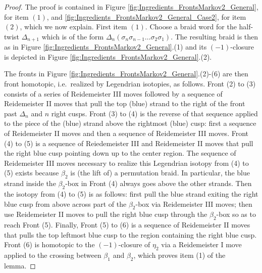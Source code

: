 \documentclass[10pt]{amsart}
\theoremstyle{plain}
\theoremstyle{definition}
\theoremstyle{remark}
\numberwithin{equation}{section}
\begin{document}
\begin{proof}
The proof is contained in Figure \ref{fig:Ingredients_FrontsMarkov2_General}, for item $(1)$, and \ref{fig:Ingredients_FrontsMarkov2_General_Case2}, for item $(2)$, which we now explain. First item $(1)$. Choose a braid word for the half-twist $\Delta_{n+1}$ which is of the form $\Delta_n(\sigma_n\sigma_{n-1}\ldots \sigma_2\sigma_1)$. The resulting braid is then as in Figure \ref{fig:Ingredients_FrontsMarkov2_General}.(1) and its $(-1)$-closure is depicted in Figure \ref{fig:Ingredients_FrontsMarkov2_General}.(2). 

The fronts in Figure \ref{fig:Ingredients_FrontsMarkov2_General}.(2)-(6) are then front homotopic, i.e.~realized by Legendrian isotopies, as follows. Front (2) to (3) consists of a series of Reidemeister III moves followed by a sequence of Reidemeister II moves that pull the top (blue) strand to the right of the front past $\Delta_n$ and $n$ right cusps. Front (3) to (4) is the reverse of that sequence applied to the piece of the (blue) strand above the rightmost (blue) cusp: first a sequence of Reidemeister II moves and then a sequence of Reidemeister III moves. Front (4) to (5) is a sequence of Reiedemeister III and Reidemeister II moves that pull the right blue cusp pointing down up to the center region. The sequence of Reidemeister III moves necessary to realize this Legendrian isotopy from (4) to (5) exists because $\beta_2$ is (the lift of) a permutation braid. In particular, the blue strand inside the $\beta_2$-box in Front (4) always goes above the other strands. Then the isotopy from (4) to (5) is as follows: first pull the blue strand exiting the right blue cusp from above across part of the $\beta_2$-box via Reidemeister III moves; then use Reidemeister II moves to pull the right blue cusp through the $\beta_2$-box so as to reach Front (5). Finally, Front (5) to (6) is a sequence of Reidemeister II moves that pulls the top leftmost blue cusp to the region containing the right blue cusp. Front (6) is homotopic to the $(-1)$-closure of $\eta_2$ via a Reidemeister I move applied to the crossing between $\beta_1$ and $\beta_2$, which proves item (1) of the lemma.


\end{proof}
\end{document}
